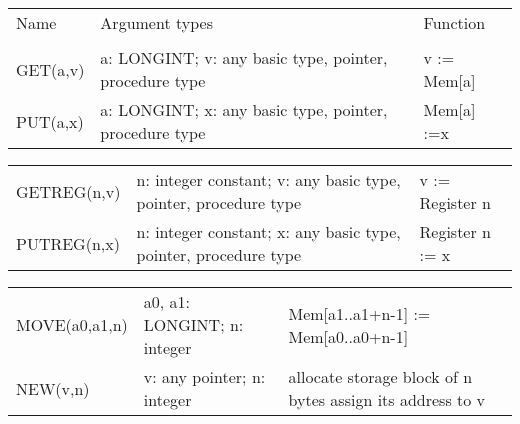 \begin{flushleft}
\ifcompact \small \fi
\settowidth{\ProcName}{MOVE(a0,a1,n)}
\ifcompact
        \ProcArg=4.0cm
        \ProcFun=3.4cm
\else
        \ProcArg=4.4cm
        \ProcFun=4.2cm
\fi
\begin{tabular}{p{\ProcName}p{\ProcArg}p{\ProcFun}}
Name      & Argument types             & Function \\
          & \\
GET(a,v)    & a: LONGINT;
              v: any basic type,
              pointer, procedure type & v := Mem[a] \\
PUT(a,x)    &  a: LONGINT;
              x: any basic type,
              pointer, procedure type & Mem[a] :=x \\
\end{tabular}
\begin{tabular}{p{\ProcName}p{\ProcArg}p{\ProcFun}}
GETREG(n,v) &  n: integer constant;
              v: any basic type,
              pointer, procedure type & v := Register n \\
PUTREG(n,x) &  n: integer constant;
              x: any basic type,
              pointer, procedure type & Register n := x \\
\end{tabular}
\begin{tabular}{p{\ProcName}p{\ProcArg}p{\ProcFun}}
MOVE(a0,a1,n) &  a0, a1: LONGINT;
                 n: integer           & Mem[a1..a1+n-1] := Mem[a0..a0+n-1] \\
NEW(v,n)      & v: any pointer;
              n: integer              & allocate storage block of n bytes
                                       assign its address to v \\
\end{tabular}
\end{flushleft}
